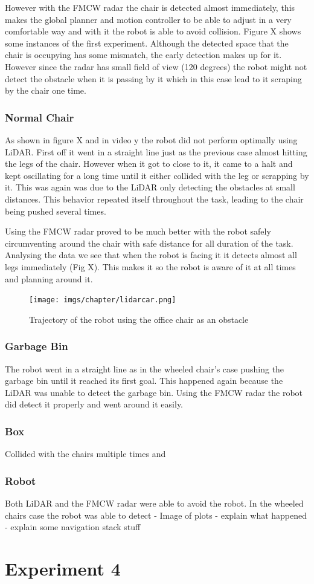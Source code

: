 However with the \ac{FMCW} radar the chair is detected almost immediately, this makes the global planner and motion controller to be able to adjust in a very comfortable way and with it the robot is able to avoid collision. Figure X shows some instances of the first experiment. Although the detected space that the chair is occupying has some mismatch, the early detection makes up for it. However since the radar has small field of view (120 degrees) the robot might not detect the obstacle when it is passing by it which in this case lead to it scraping by the chair one time.
\subsubsection{Normal Chair}
As shown in figure X and in video y the robot did not perform optimally using \ac{LiDAR}. First off it went in a straight line just as the previous case almost hitting  the legs of the chair. However when it got to close to it, it came to a halt and kept oscillating for a long time until it either collided with the leg or scrapping by it. This was again was due to the \ac{LiDAR} only detecting the obstacles at small distances. This behavior repeated itself throughout the task, leading to the chair being pushed several times. 

Using the \ac{FMCW} radar proved to be much better with the robot safely circumventing around the chair with safe distance for all duration of the task. Analysing the data we see that when the robot is facing it it detects almost all legs immediately (Fig X). This makes it so the robot is aware of it at all times and planning around it.
\begin{figure}[h] 
\centerline{\texttt{[image: imgs/chapter/lidarcar.png]}}
\caption{Trajectory of the robot using the office chair as an obstacle}
\label{fig:lidarcar}
\end{figure}

\subsubsection{Garbage Bin}
The robot went in a straight line as in the wheeled chair's case pushing the garbage bin until it reached its first goal. This happened again because the \ac{LiDAR} was unable to detect the garbage bin. Using the \ac{FMCW} radar the robot did detect it properly and went around it easily.
\subsubsection{Box}
Collided with the chairs multiple times and 
\subsubsection{Robot}
Both \ac{LiDAR} and the FMCW radar were able to avoid the robot. 
In the wheeled chairs case the robot was able to detect 
- Image of plots
- explain what happened
- explain some navigation stack stuff

\section {Experiment 4}